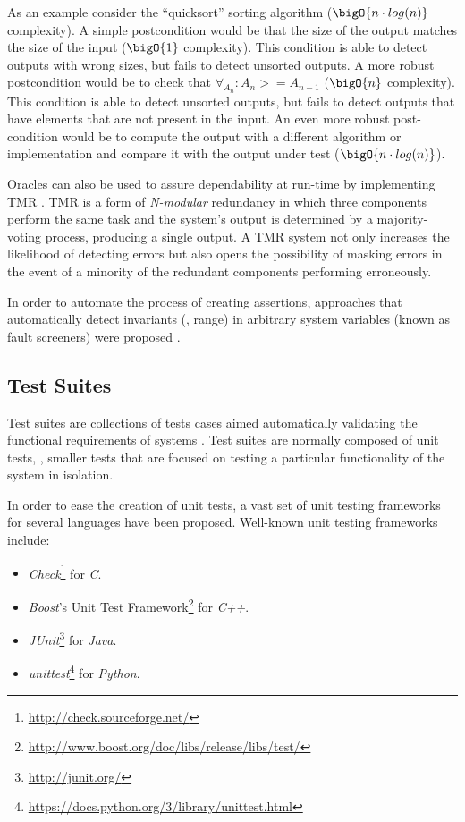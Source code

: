 As an example consider the ``quicksort'' sorting algorithm ($\bigO{n \cdot
  log(n)}$ complexity).
%
A simple postcondition would be that the size of the output matches
the size of the input ($\bigO{1}$ complexity).
%
This condition is able to detect outputs with wrong sizes, but fails
to detect unsorted outputs.
%
A more robust postcondition would be to check that $\forall_{A_n}: A_n
>= A_{n - 1}$ ($\bigO{n}$ complexity).
%
This condition is able to detect unsorted outputs, but fails to detect
outputs that have elements that are not present in the input.
%
An even more robust post-condition would be to compute the output with
a different algorithm or implementation and compare it with the output
under test ($\bigO{n\cdot log(n)}$).


Oracles can also be used to assure dependability at run-time by
implementing \ac{TMR} \citep{Lyons62,Johnson10}.
%
\ac{TMR} is a form of \emph{N-modular} redundancy in which three
components perform the same task and the system's output is determined
by a majority-voting process, producing a single output.
%
A \ac{TMR} system not only increases the likelihood of detecting
errors but also opens the possibility of masking errors in the event
of a minority of the redundant components performing erroneously.


In order to automate the process of creating assertions, approaches
that automatically detect invariants (\eg, range) in arbitrary system
variables (known as fault screeners) were proposed
\citep{Abreu08c,Ernst00,Ernst01,Ernst07,Hangal02,Pinto15,Racunas07}.

\subsection*{Test Suites}
\label{sec:related-work:testing}
Test suites are collections of tests cases aimed automatically
validating the functional requirements of systems \citep{Huizinga07}.
%
Test suites are normally composed of unit tests, \ie, smaller tests
that are focused on testing a particular functionality of the system
in isolation.

In order to ease the creation of unit tests, a vast set of unit
testing frameworks for several languages have been proposed.
%
Well-known unit testing frameworks include:
\begin{itemize}[nolistsep]
\item \emph{Check}\footnote{\url{http://check.sourceforge.net/}} for \emph{C}.
\item \emph{Boost}'s Unit Test
  Framework\footnote{\url{http://www.boost.org/doc/libs/release/libs/test/}}
  for \emph{C++}.
\item \emph{JUnit}\footnote{\url{http://junit.org/}} for \emph{Java}.
\item \emph{unittest}\footnote{\url{https://docs.python.org/3/library/unittest.html}} for
  \emph{Python}.
\end{itemize}


